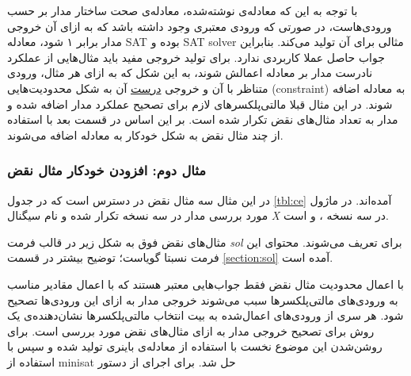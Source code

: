\documentclass{article}
\begin{document}
با توجه به این که معادله‌ی نوشته‌شده، معادله‌ی صحت ساختار مدار بر حسب ورودی‌هاست، در صورتی که ورودی معتبری وجود داشته باشد که به ازای آن خروجی مدار برابر ۱ شود، معادله SAT بوده و SAT solver مثالی برای آن تولید می‌کند. بنابراین جواب حاصل عملا کاربردی ندارد. برای تولید خروجی مفید باید مثال‌هایی از عملکرد نادرست مدار بر معادله اعمالش شوند، به این شکل که به ازای هر مثال، ورودی متناظر با آن و خروجی \underline{درست} آن به شکل محدودیت‌هایی (constraint) به معادله اضافه شوند. در این مثال قبلا مالتی‌پلکسرهای لازم برای تصحیح عملکرد مدار اضافه شده و مدار به تعداد مثال‌های نقض تکرار شده است. بر این اساس در قسمت بعد با استفاده از  چند مثال نقض به شکل خودکار به معادله اضافه می‌شوند. 

\subsubsection {مثال دوم: افزودن خودکار مثال نقض}

در این مثال سه مثال نقض در دسترس است که در جدول \ref{tbl:ce} آمده‌اند. در ماژول مورد بررسی مدار در سه نسخه تکرار شده و نام سیگنال \textit{X} در سه نسخه {}، {} و {} است. 


مثال‌های نقض فوق به شکل زیر در قالب فرمت \textit{sol} برای  تعریف می‌شوند. محتوای این فرمت نسبتا گویاست؛ توضیح بیشتر در قسمت \ref{section:sol} آمده است. 

\begin{LTR}{}\end{LTR}

با اعمال محدودیت مثال نقض فقط جواب‌هایی معتبر هستند که با اعمال مقادیر مناسب به ورودی‌های مالتی‌پلکسرها سبب می‌شوند خروجی مدار به ازای این ورودی‌ها تصحیح شود. هر سری از ورودی‌های اعمال‌شده به بیت انتخاب مالتی‌پلکسرها نشان‌دهنده‌ی یک روش برای تصحیح خروجی مدار به ازای مثال‌های نقض مورد بررسی است. برای روشن‌شدن این موضوع نخست با استفاده از  معادله‌ی باینری تولید شده و سپس با استفاده از minisat حل شد. برای اجرای  از دستور 
\end{document}
